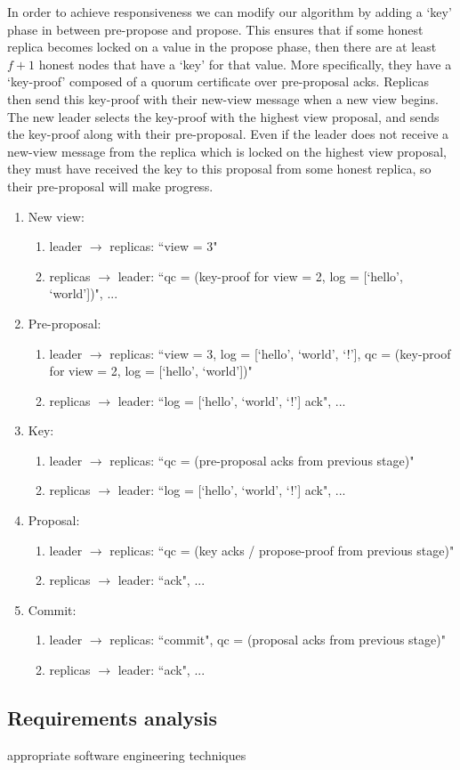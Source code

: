 In order to achieve responsiveness we can modify our algorithm by adding a `key' phase in between pre-propose and propose. This ensures that if some honest replica becomes locked on a value in the propose phase, then there are at least $f + 1$ honest nodes that have a `key' for that value. More specifically, they have a `key-proof' composed of a quorum certificate over pre-proposal acks. Replicas then send this key-proof with their new-view message when a new view begins. The new leader selects the key-proof with the highest view proposal, and sends the key-proof along with their pre-proposal. Even if the leader does not receive a new-view message from the replica which is locked on the highest view proposal, they must have received the key to this proposal from some honest replica, so their pre-proposal will make progress.

\begin{enumerate}
\item New view: 
	\begin{enumerate}
	\item leader $\to$ replicas: ``view = 3" 
	\item replicas $\to$ leader: ``qc = (key-proof for view = 2, log = [`hello', `world'])", ...
	\end{enumerate}
\item Pre-proposal:
	\begin{enumerate}
	\item leader $\to$ replicas: ``view = 3, log = [`hello', `world', `!'], qc = (key-proof for view = 2, log = [`hello', `world'])"
	\item replicas $\to$ leader: ``log = [`hello', `world', `!'] ack", ...
	\end{enumerate}
\item Key:
	\begin{enumerate}
	\item leader $\to$ replicas: ``qc = (pre-proposal acks from previous stage)"
	\item replicas $\to$ leader: ``log = [`hello', `world', `!'] ack", ...
	\end{enumerate}

\item Proposal:
	\begin{enumerate}
	\item leader $\to$ replicas: ``qc = (key acks / propose-proof from previous stage)"
	\item replicas $\to$ leader: ``ack", ...
	\end{enumerate}
\item Commit:
	\begin{enumerate}
	\item leader $\to$ replicas: ``commit", qc = (proposal acks from previous stage)"
	\item replicas $\to$ leader: ``ack", ...
	\end{enumerate}
\end{enumerate}

\subsection{Requirements analysis}
appropriate software engineering techniques